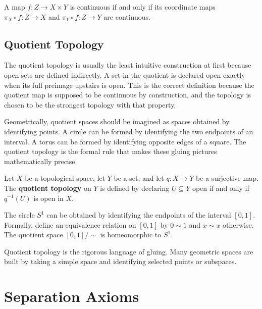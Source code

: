 \begin{proposition}
A map $f:Z\to X\times Y$ is continuous if and only if its coordinate maps $\pi_X\circ f:Z\to X$ and $\pi_Y\circ f:Z\to Y$ are continuous.
\end{proposition}

\subsection{Quotient Topology}


The quotient topology is usually the least intuitive construction at first because open sets are defined indirectly. A set in the quotient is declared open exactly when its full preimage upstairs is open. This is the correct definition because the quotient map is supposed to be continuous by construction, and the topology is chosen to be the strongest topology with that property.

Geometrically, quotient spaces should be imagined as spaces obtained by identifying points. A circle can be formed by identifying the two endpoints of an interval. A torus can be formed by identifying opposite edges of a square. The quotient topology is the formal rule that makes these gluing pictures mathematically precise.

\begin{definition}
Let $X$ be a topological space, let $Y$ be a set, and let $q:X\to Y$ be a surjective map. The \textbf{quotient topology} on $Y$ is defined by declaring $U\subseteq Y$ open if and only if $q^{-1}(U)$ is open in $X$.
\end{definition}

\begin{example}
The circle $S^1$ can be obtained by identifying the endpoints of the interval $[0,1]$. Formally, define an equivalence relation on $[0,1]$ by $0\sim 1$ and $x\sim x$ otherwise. The quotient space $[0,1]/\sim$ is homeomorphic to $S^1$.
\end{example}

\begin{remark}
Quotient topology is the rigorous language of gluing. Many geometric spaces are built by taking a simple space and identifying selected points or subspaces.
\end{remark}

\section{Separation Axioms}



